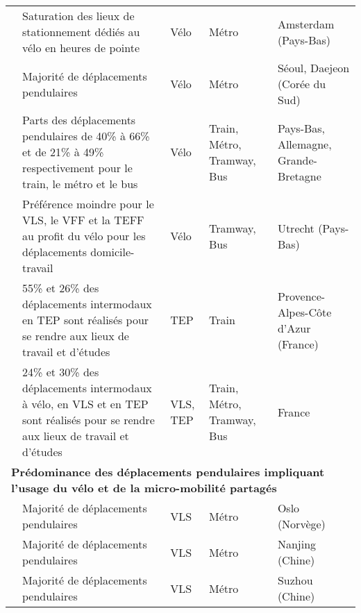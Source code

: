\begin{longtable}{p{3cm}p{4cm}p{1.5cm}p{1.8cm}p{2.3cm}}
    \small{\textcite{kampen_bicycle_2021}}\index{van Kampen, Jullian|pagebf} & \small{Saturation des lieux de stationnement dédiés au vélo en heures de pointe} & \small{Vélo} & \small{Métro} & \small{Amsterdam (Pays-Bas)}\\
    \small{\textcite{lee_strategies_2010}}\index{Lee, Jaeyeong|pagebf} & \small{Majorité de déplacements pendulaires} & \small{Vélo} & \small{Métro} & \small{Séoul, Daejeon (Corée du Sud)}\\
    \small{\textcite{martens_bicycle_2004}}\index{Martens, Karel|pagebf} & \small{Parts des déplacements pendulaires de 40\% à 66\% et de 21\% à 49\% respectivement pour le train, le métro et le bus} & \small{Vélo} & \small{Train, Métro, Tramway, Bus} & \small{Pays-Bas, Allemagne, Grande-Bretagne}\\
    \small{\textcite{kuijk_preferences_2022}}\index{van Kuijk, R.J.|pagebf} & \small{Préférence moindre pour le VLS, le VFF et la TEFF au profit du vélo pour les déplacements domicile-travail} & \small{Vélo} & \small{Tramway, Bus} & \small{Utrecht (Pays-Bas)}\\
    \small{\textcite{moinse_intermodal_2022}}\index{Moinse, Dylan|pagebf} & \small{55\% et 26\% des déplacements intermodaux en TEP sont réalisés pour se rendre aux lieux de travail et d'études} & \small{TEP} & \small{Train} & \small{Provence-Alpes-Côte d'Azur (France)}\\
    \small{\textcite{rabaud_quand_2022}}\index{Rabaud, Mathieu|pagebf} & \small{24\% et 30\% des déplacements intermodaux à vélo, en VLS et en TEP sont réalisés pour se rendre aux lieux de travail et d'études} & \small{VLS, TEP} & \small{Train, Métro, Tramway, Bus} & \small{France}\\
    \hline
\multicolumn{5}{l}{\textbf{Prédominance des déplacements pendulaires impliquant l'usage du vélo et de la \gls{micro-mobilité} partagés}}\\
    \small{\textcite{bocker_bike_2020}}\index{Böcker, Lars|pagebf} & \small{Majorité de déplacements pendulaires} & \small{VLS} & \small{Métro} & \small{Oslo (Norvège)}\\
    \small{\textcite{ma_understanding_2018}}\index{Ma, Xinwei|pagebf} & \small{Majorité de déplacements pendulaires} & \small{VLS} & \small{Métro} & \small{Nanjing (Chine)}\\
    \small{\textcite{ma_measuring_2018}}\index{Ma, Xinwei|pagebf} & \small{Majorité de déplacements pendulaires} & \small{VLS} & \small{Métro} & \small{Suzhou (Chine)}\\

\end{longtable}
